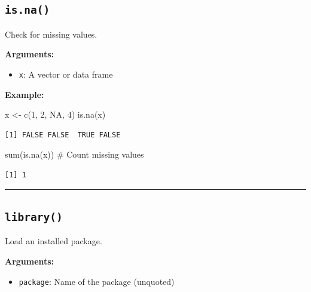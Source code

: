 \documentclass[
  letterpaper,
  DIV=11,
  numbers=noendperiod]{scrreprt}
\newenvironment{Shaded}{\begin{snugshade}}{\end{snugshade}}
\newcommand{\CommentTok}[1]{\textcolor[rgb]{0.37,0.37,0.37}{#1}}
\newcommand{\ConstantTok}[1]{\textcolor[rgb]{0.56,0.35,0.01}{#1}}
\newcommand{\DecValTok}[1]{\textcolor[rgb]{0.68,0.00,0.00}{#1}}
\newcommand{\FunctionTok}[1]{\textcolor[rgb]{0.28,0.35,0.67}{#1}}
\newcommand{\NormalTok}[1]{\textcolor[rgb]{0.00,0.23,0.31}{#1}}
\newcommand{\OtherTok}[1]{\textcolor[rgb]{0.00,0.23,0.31}{#1}}
\providecommand{\tightlist}{%
  \setlength{\itemsep}{0pt}\setlength{\parskip}{0pt}}
\begin{document}
\subsection{\texorpdfstring{\texttt{is.na()}}{is.na()}}\label{is.na}

Check for missing values.

\textbf{Arguments:}

\begin{itemize}
\tightlist
\item
  \texttt{x}: A vector or data frame
\end{itemize}

\textbf{Example:}

\begin{Shaded}
\begin{Highlighting}[]
\NormalTok{x }\OtherTok{\textless{}{-}} \FunctionTok{c}\NormalTok{(}\DecValTok{1}\NormalTok{, }\DecValTok{2}\NormalTok{, }\ConstantTok{NA}\NormalTok{, }\DecValTok{4}\NormalTok{)}
\FunctionTok{is.na}\NormalTok{(x)}
\end{Highlighting}
\end{Shaded}

\begin{verbatim}
[1] FALSE FALSE  TRUE FALSE
\end{verbatim}

\begin{Shaded}
\begin{Highlighting}[]
\FunctionTok{sum}\NormalTok{(}\FunctionTok{is.na}\NormalTok{(x))  }\CommentTok{\# Count missing values}
\end{Highlighting}
\end{Shaded}

\begin{verbatim}
[1] 1
\end{verbatim}

\begin{center}\rule{0.5\linewidth}{0.5pt}\end{center}

\subsection{\texorpdfstring{\texttt{library()}}{library()}}\label{library}

Load an installed package.

\textbf{Arguments:}

\begin{itemize}
\tightlist
\item
  \texttt{package}: Name of the package (unquoted)
\end{itemize}
\end{document}
